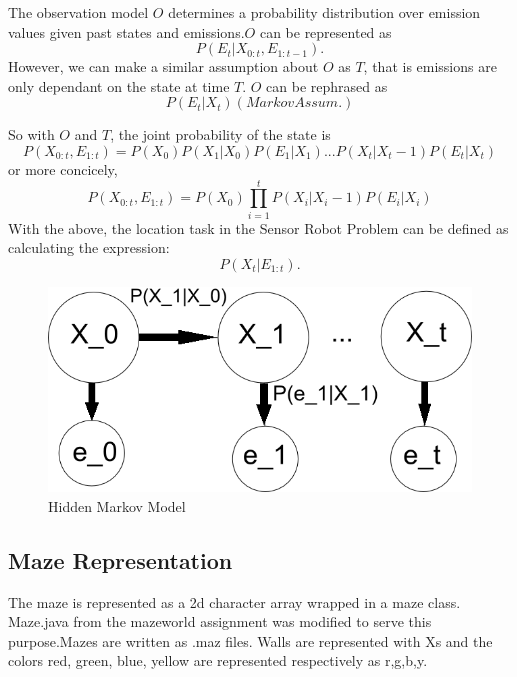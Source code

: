 \documentclass[a4paper]{article}
\begin{document}
The observation model $O$ determines a probability distribution over emission values given past states and emissions.$O$ can be represented as
\begin{equation}
P(E_t|X_{0:t}, E_{1:t-1}).
\end{equation}
	However, we can make a similar assumption about $O$ as $T$, that is emissions are only dependant on the state at time $T$. $O$ can be rephrased as 
\begin{equation}
P(E_t|X_t)(Markov Assum.)
\end{equation}

So with $O$ and $T$, the joint probability of the state is 
\begin{equation}
P(X_{0:t}, E_{1:t}) = P(X_0)P(X_1|X_0)P(E_1|X_1)...P(X_t|X_t-1)P(E_t|X_t)
\end{equation}
or more concicely,
\begin{equation}
P(X_{0:t}, E_{1:t}) = P(X_0)\prod_{i=1}^{t} P(X_i|X_i-1)P(E_i|X_i)
\end{equation}
With the above, the location task in the Sensor Robot Problem can be defined as calculating the expression:
\begin{equation}
P(X_t|E_{1:t}).
\end{equation}


\begin{figure}[H]
\centering
\includegraphics[width=1.2\textwidth]{HMM.png}
\caption{\label{fig:2x2 maze}Hidden Markov Model}
\end{figure}

\subsection{Maze Representation}

The maze is represented as a 2d character array wrapped in a maze class. Maze.java from the mazeworld assignment was modified to serve this purpose.Mazes are written as .maz files. Walls are represented with Xs and the colors red, green, blue, yellow are represented respectively as r,g,b,y.
\end{document}
